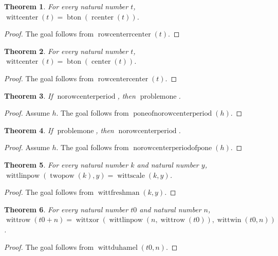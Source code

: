 \documentclass[11pt]{article}
\newtheorem{theorem}{Theorem}[section]
\theoremstyle{definition}
\begin{document}
\begin{theorem}
\label{ll:paper:witt-center-rcenter}
For every natural number \(t\), \(\operatorname{wittcenter}(t) = \operatorname{bton}(\operatorname{rcenter}(t))\).
\end{theorem}
\begin{proof}
The goal follows from \(\operatorname{rowcenterrcenter}(t)\).
\end{proof}
\begin{theorem}
\label{ll:paper:witt-center-cell}
For every natural number \(t\), \(\operatorname{wittcenter}(t) = \operatorname{bton}(\operatorname{center}(t))\).
\end{theorem}
\begin{proof}
The goal follows from \(\operatorname{rowcentercenter}(t)\).
\end{proof}
\begin{theorem}
\label{ll:paper:witt-noperiod-sufficient}
If \(\operatorname{norowcenterperiod}\), then \(\operatorname{problemone}\).
\end{theorem}
\begin{proof}
Assume \(h\).
The goal follows from \(\operatorname{poneofnorowcenterperiod}(h)\).
\end{proof}
\begin{theorem}
\label{ll:paper:witt-noperiod-necessary}
If \(\operatorname{problemone}\), then \(\operatorname{norowcenterperiod}\).
\end{theorem}
\begin{proof}
Assume \(h\).
The goal follows from \(\operatorname{norowcenterperiodofpone}(h)\).
\end{proof}
\begin{theorem}
\label{ll:paper:witt-freshman}
For every natural number \(k\) and natural number \(y\), \(\operatorname{wittlinpow}(\operatorname{twopow}(k), y) = \operatorname{wittscale}(k, y)\).
\end{theorem}
\begin{proof}
The goal follows from \(\operatorname{wittfreshman}(k, y)\).
\end{proof}
\begin{theorem}
\label{ll:paper:witt-duhamel}
For every natural number \(t0\) and natural number \(n\), \(\operatorname{wittrow}(t0 + n) = \operatorname{wittxor}(\operatorname{wittlinpow}(n, \operatorname{wittrow}(t0)), \operatorname{wittwin}(t0, n))\).
\end{theorem}
\begin{proof}
The goal follows from \(\operatorname{wittduhamel}(t0, n)\).
\end{proof}
\end{document}
